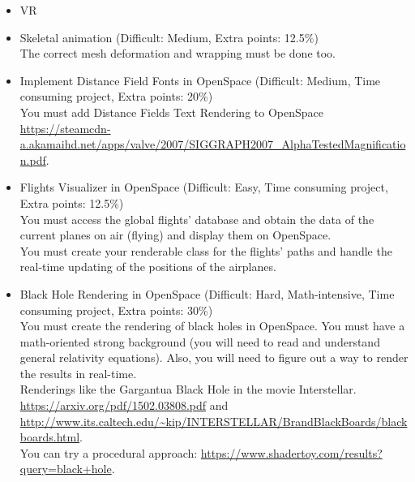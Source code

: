 \documentclass[11pt]{article}
\begin{document}
\begin{itemize}
\item VR
\item Skeletal animation (Difficult: Medium, Extra points: 12.5\%)\\
 The correct mesh deformation and wrapping must be done too. 
\item Implement Distance Field Fonts in OpenSpace (Difficult: Medium, Time consuming project, Extra points: 20\%)\\
You must add Distance Fields Text Rendering to OpenSpace
\url{https://steamcdn-a.akamaihd.net/apps/valve/2007/SIGGRAPH2007_AlphaTestedMagnification.pdf}.
\item Flights Visualizer in OpenSpace (Difficult: Easy, Time consuming project, Extra points: 12.5\%)\\
You must access the global flights' database and obtain the data of the current planes on air (flying) and display them on OpenSpace.\\
You must create your renderable class for the flights' paths and handle the real-time updating of the positions of the airplanes.
\item Black Hole Rendering in OpenSpace (Difficult: Hard, Math-intensive, Time consuming project, Extra points: 30\%)\\
You must create the rendering of black holes in OpenSpace. You must have a math-oriented strong background (you will need to read and understand general relativity equations). Also, you will need to figure out a way to render the results in real-time.\\
Renderings like the Gargantua Black Hole in the movie Interstellar.
\url{https://arxiv.org/pdf/1502.03808.pdf} and \url{http://www.its.caltech.edu/~kip/INTERSTELLAR/BrandBlackBoards/blackboards.html}.\\
You can try a procedural approach: \url{https://www.shadertoy.com/results?query=black+hole}.

\end{itemize}

%
%
\end{document}
